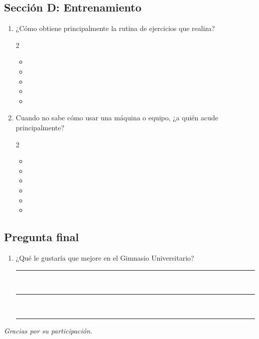\subsection*{Sección D: Entrenamiento}
\begin{enumerate}[resume*=cuest]
  \item ¿Cómo obtiene principalmente la rutina de ejercicios que realiza?
  \begin{multicols}{2}
  \begin{itemize}[label={}, leftmargin=0pt, itemsep=0pt]
    \item {}
    \item {}
    \item {}
    \item {}
    \item {}
  \end{itemize}
  \end{multicols}

  \item Cuando no sabe cómo usar una máquina o equipo, ¿a quién acude principalmente?
  \begin{multicols}{2}
  \begin{itemize}[label={}, leftmargin=0pt, itemsep=0pt]
    \item {}
    \item {}
    \item {}
    \item {}
    \item {}
    \item {}
  \end{itemize}
  \end{multicols}
\end{enumerate}

\subsection*{Pregunta final}
\begin{enumerate}[resume*=cuest]
  \item ¿Qué le gustaría que mejore en el Gimnasio Universitario?\\[0.8em]
  \rule{\linewidth}{0.4pt}\\[0.8em]
  \rule{\linewidth}{0.4pt}\\[0.8em]
  \rule{\linewidth}{0.4pt}
\end{enumerate}

\begin{center}\small\emph{Gracias por su participación.}\end{center}
